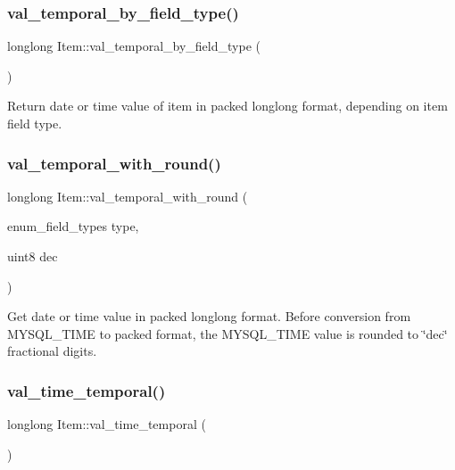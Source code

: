 \mbox{\label{classItem_a00ab36bcf5ebe7138e869d1ceecee573}} 
\subsubsection{\texorpdfstring{val\+\_\+temporal\+\_\+by\+\_\+field\+\_\+type()}{val\_temporal\_by\_field\_type()}}
{\footnotesize\ttfamily longlong Item\+::val\+\_\+temporal\+\_\+by\+\_\+field\+\_\+type (\begin{DoxyParamCaption}{ }\end{DoxyParamCaption})\hspace{0.3cm}{\ttfamily [inline]}}

Return date or time value of item in packed longlong format, depending on item field type. \mbox{\label{classItem_a934c293f50afd4e39891b26beef3e3c4}} 
\subsubsection{\texorpdfstring{val\+\_\+temporal\+\_\+with\+\_\+round()}{val\_temporal\_with\_round()}}
{\footnotesize\ttfamily longlong Item\+::val\+\_\+temporal\+\_\+with\+\_\+round (\begin{DoxyParamCaption}\item[{enum\+\_\+field\+\_\+types}]{type,  }\item[{uint8}]{dec }\end{DoxyParamCaption})}

Get date or time value in packed longlong format. Before conversion from M\+Y\+S\+Q\+L\+\_\+\+T\+I\+ME to packed format, the M\+Y\+S\+Q\+L\+\_\+\+T\+I\+ME value is rounded to \char`\"{}dec\char`\"{} fractional digits. \mbox{\label{classItem_a69ef60a3917a1bb4832498a695754c58}} 
\subsubsection{\texorpdfstring{val\+\_\+time\+\_\+temporal()}{val\_time\_temporal()}}
{\footnotesize\ttfamily longlong Item\+::val\+\_\+time\+\_\+temporal (\begin{DoxyParamCaption}{ }\end{DoxyParamCaption})\hspace{0.3cm}{\ttfamily [virtual]}}

